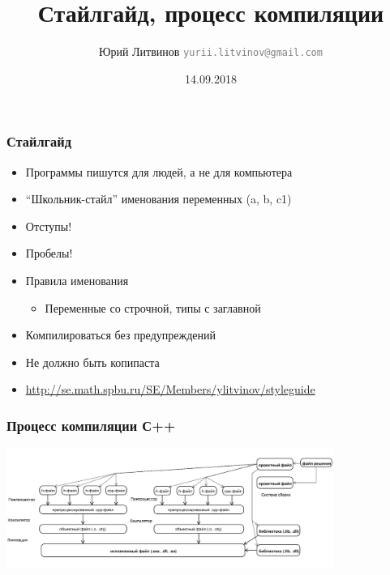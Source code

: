 \documentclass[xetex,mathserif,serif]{beamer}
\title{Стайлгайд, процесс компиляции}
\author[Юрий Литвинов]{Юрий Литвинов \newline \textcolor{gray}{\small\texttt{yurii.litvinov@gmail.com}}}
\date{14.09.2018}
\begin{document}
	
	\frame{\titlepage}
	
	\begin{frame}
		\frametitle{Стайлгайд}
		\begin{itemize}
			\item Программы пишутся для людей, а не для компьютера
			\item “Школьник-стайл” именования переменных (a, b, c1)
			\item Отступы!
			\item Пробелы!
			\item Правила именования
			\begin{itemize}
				\item Переменные со строчной, типы с заглавной
			\end{itemize}
			\item Компилироваться без предупреждений
			\item Не должно быть копипаста
			\item \url{http://se.math.spbu.ru/SE/Members/ylitvinov/styleguide}
		\end{itemize}
	\end{frame}

	\begin{frame}
		\frametitle{Процесс компиляции С++}
		\begin{center}
			\includegraphics[width=0.8\textwidth]{compilation.png}
		\end{center}
	\end{frame}
\end{document}
